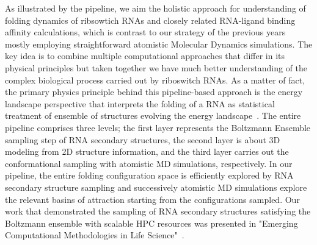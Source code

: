 \documentclass[a4paper,10pt]{article}
\begin{document}
As illustrated by the pipeline, we aim the holistic approach for understanding of folding dynamics of ribsowtich RNAs and closely related RNA-ligand binding affinity calculations, which is contrast to our strategy of the previous years mostly employing straightforward atomistic Molecular Dynamics simulations.  The key idea is to combine multiple computational approaches that differ in its physical principles but taken together we have much better understanding of the complex biological process carried out by riboswitch RNAs.  As a matter of fact, the primary physics principle behind this pipeline-based approach is the energy landscape perspective that interprets the folding of a RNA as statistical treatment of ensemble of structures evolving the energy landscape~\cite{onuchic1997}. The entire pipeline comprises three levels; the first layer represents the Boltzmann Ensemble sampling step of RNA secondary structures, the second layer is about 3D modeling from 2D structure information, and the third layer carries out the conformational sampling with atomistic MD simulations, respectively.  In our pipeline, the entire folding configuration space is efficiently explored by RNA secondary structure sampling and successively atomistic MD simulations explore the relevant basins of attraction starting from the configurations sampled.  Our work that demonstrated the sampling of RNA secondary structures satisfying the Boltzmann ensemble with scalable HPC resources was presented in "Emerging Computational Methodologies in Life Science"~\cite{ecmls10}. 
\end{document}

